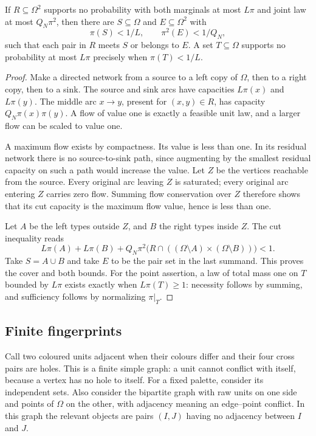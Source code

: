 \begin{lemma}\label{gt:flow-cut}
If \(R\subseteq\Omega^2\) supports no probability with both
marginals at most \(L\pi\) and joint law at most \(Q_N\pi^2\),
then there are \(S\subseteq\Omega\) and \(E\subseteq\Omega^2\)
with
\begin{equation}\label{eq:uncoloured-terminal-cover}
 \pi(S)<1/L,\qquad \pi^2(E)<1/Q_N,
\end{equation}
such that each pair in \(R\) meets \(S\) or belongs to \(E\).
A set \(T\subseteq\Omega\) supports no probability at most
\(L\pi\) precisely when \(\pi(T)<1/L\).
\end{lemma}
\begin{proof}
Make a directed network from a source to a left copy of \(\Omega\),
then to a right copy, then to a sink.  The source and sink arcs
have capacities \(L\pi(x)\) and \(L\pi(y)\).  The middle arc
\(x\to y\), present for \((x,y)\in R\), has capacity
\(Q_N\pi(x)\pi(y)\).  A flow of value one is exactly a feasible
unit law, and a larger flow can be scaled to value one.

A maximum flow exists by compactness.  Its value is less than one.
In its residual network there is no source-to-sink path, since
augmenting by the smallest residual capacity on such a path would
increase the value.  Let \(Z\) be the vertices reachable from the
source.  Every original arc leaving \(Z\) is saturated; every
original arc entering \(Z\) carries zero flow.  Summing flow
conservation over \(Z\) therefore shows that its cut capacity is
the maximum flow value, hence is less than one.

Let \(A\) be the left types outside \(Z\), and \(B\) the right
types inside \(Z\).  The cut inequality reads
\[
 L\pi(A)+L\pi(B)
 +Q_N\pi^2\bigl(R\cap((\Omega\setminus A)
                         \times(\Omega\setminus B))\bigr)<1.
\]
Take \(S=A\cup B\) and take \(E\) to be the pair set in the
last summand.  This proves the cover and both bounds.  For the
point assertion, a law of total mass one on \(T\) bounded by
\(L\pi\) exists exactly when \(L\pi(T)\ge1\): necessity follows
by summing, and sufficiency follows by normalizing \(\pi|_T\).
\end{proof}

\subsection{Finite fingerprints}

Call two coloured units adjacent when their colours differ and
their four cross pairs are holes.  This is a finite simple graph:
a unit cannot conflict with itself, because a vertex has no hole
to itself.  For a fixed palette, consider its independent sets.
Also consider the bipartite graph with raw units on one side and
points of \(\Omega\) on the other, with adjacency meaning an
edge--point conflict.  In this graph the relevant objects are pairs
\((I,J)\) having no adjacency between \(I\) and \(J\).

